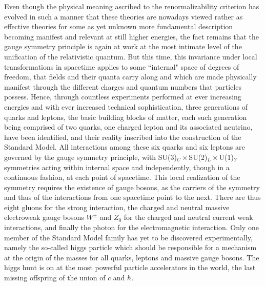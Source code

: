 \documentclass[a4paper,11pt]{article}
\begin{document}
Even though the physical meaning ascribed to the renormalizability criterion 
has evolved in such a manner that these theories are nowadays viewed rather
as effective theories for some as yet unknown more fundamental description
becoming manifest and relevant at still higher energies,\cite{Wein1}
the fact remains that the gauge symmetry principle is again at
work at the most intimate level of the unification of the relativistic
quantum. But this time, this invariance under local transformations in
spacetime applies to some ``internal" space of degrees of freedom,
that fields and their quanta carry along and which are made physically manifest
through the different charges and quantum numbers that particles possess.
Hence, through countless experiments performed at ever increasing
energies and with ever increased technical sophistication, three
generations of quarks and leptons, the basic building blocks of matter, 
each such generation being comprised of two quarks, one charged lepton
and its associated neutrino, have been identified, and their reality
inscribed into the construction of the Standard Model. All interactions
among these six quarks and six leptons are governed by the gauge
symmetry principle, with SU(3)$_C\times$SU(2)$_L\times$U(1)$_Y$ symmetries
acting within internal space and independently, though in a continuous
fashion, at each point of spacetime. This local realization of the
symmetry requires the existence of gauge bosons, as the carriers of the
symmetry and thus of the interactions from one spacetime point to the next.
There are thus eight gluons for the strong interaction, the charged and neutral
massive electroweak gauge bosons $W^\pm$ and $Z_0$ for the charged and
neutral current weak interactions, and finally the photon for the
electromagnetic interaction. Only one member of the Standard Model family
has yet to be discovered experimentally, namely the so-called higgs particle
which should be responsible for a mechanism at the origin of the masses for
all quarks, leptons and massive gauge bosons. The higgs hunt is on at the most
powerful particle accelerators in the world, the last missing offspring
of the union of $c$ and $\hbar$.
\end{document}
